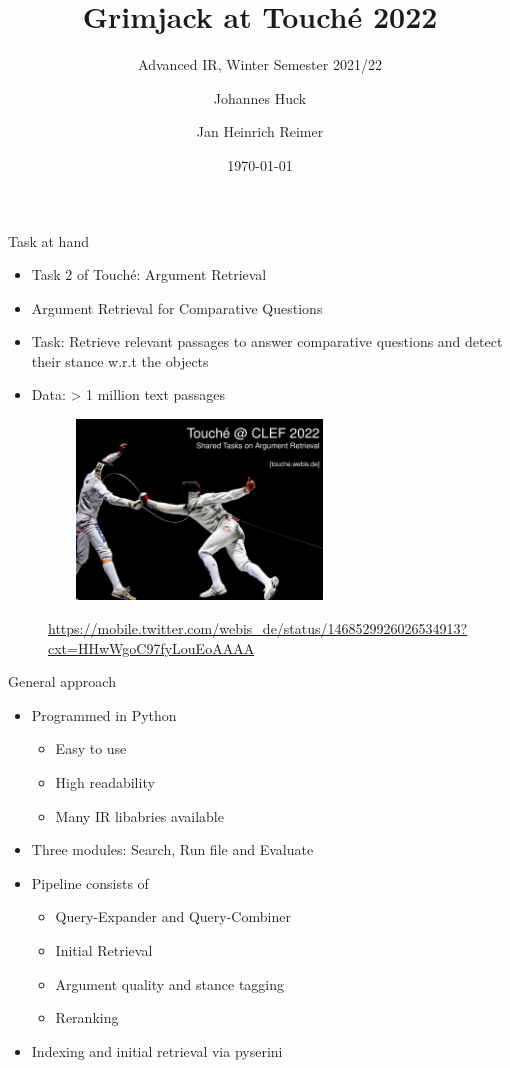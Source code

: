 \documentclass[english]{mlutalk}
\title{Grimjack at Touché 2022}
\subtitle{Advanced IR, Winter Semester 2021/22}
\author{Johannes Huck \and Jan Heinrich Reimer}
\institute{Martin Luther University Halle-Wittenberg}
\date{\today}
\begin{document}
\titleframe

\begin{frame}{Task at hand}  
  \begin{itemize}
    \item Task 2 of Touché: Argument Retrieval
    \item Argument Retrieval for Comparative Questions
    \item Task: Retrieve relevant passages to answer comparative questions and detect their stance w.r.t the objects
    \item Data: > 1 million text passages  
  \end{itemize}
  \begin{figure}
      \centering
      \includegraphics[height=4.8cm, width=8cm]{figures/touche.jpeg}\\
      \begin{footnotesize}
        \url{https://mobile.twitter.com/webis_de/status/1468529926026534913?cxt=HHwWgoC97fyLouEoAAAA}
      \end{footnotesize}  
  \end{figure}
\end{frame}

\begin{frame}{General approach}
  \begin{itemize}
    \item Programmed in Python
    \begin{itemize}
        \item Easy to use
        \item High readability
        \item Many IR libabries available
    \end{itemize}
    \item Three modules: Search, Run file  and Evaluate
    \item Pipeline consists of
    \begin{itemize}
        \item Query-Expander and Query-Combiner
        \item Initial Retrieval
        \item Argument quality and stance tagging
        \item Reranking
    \end{itemize}
    \item Indexing and initial retrieval via pyserini~\cite{LinMLYPN2021}
  \end{itemize}
\end{frame}
\end{document}
